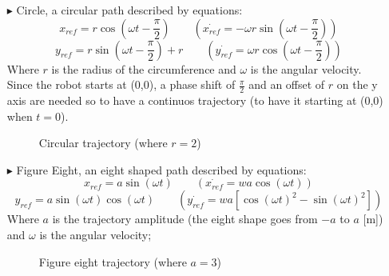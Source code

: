 \begin{itemize}
\begin{itemize}
			\item[$\blacktriangleright$] Circle, a circular path described by equations:
				\[x_{ref} = r\cos(\omega t - \frac{\pi}{2}) \qquad (\dot{x_{ref}} = -\omega r\sin(\omega t - \frac{\pi}{2})) \]
				\[y_{ref} = r\sin(\omega t - \frac{\pi}{2}) + r \qquad (\dot{y_{ref}} = \omega r\cos(\omega t - \frac{\pi}{2})) \]
				Where $r$ is the radius of the circumference and $\omega$ is the angular velocity. \\
				Since the robot starts at (0,0), a phase shift of $\frac{\pi}{2}$ and an offset of $r$ on the
				y axis are needed so to have a continuos trajectory (to have it starting at (0,0) when $t=0$).

				\begin{figure}[H]
					\caption{Circular trajectory (where $r = 2$)}
					\end{figure}
	
			\item[$\blacktriangleright$] Figure Eight, an eight shaped path described by equations:
				\[x_{ref} = a\sin(\omega t) \qquad (\dot{x_{ref}} = wa\cos(\omega t)) \]
				\[y_{ref} = a\sin(\omega t)\cos(\omega t) \qquad (\dot{y_{ref}} = wa[\cos(\omega t)^2 - \sin(\omega t)^2]) \]
				Where $a$ is the trajectory amplitude (the eight shape goes from $-a$ to $a$ [m]) and $\omega$ is the angular velocity;
			
				\begin{figure}[H]
					\caption{Figure eight trajectory (where $a = 3$)}
					\end{figure}
			

\end{itemize}
\end{itemize}
